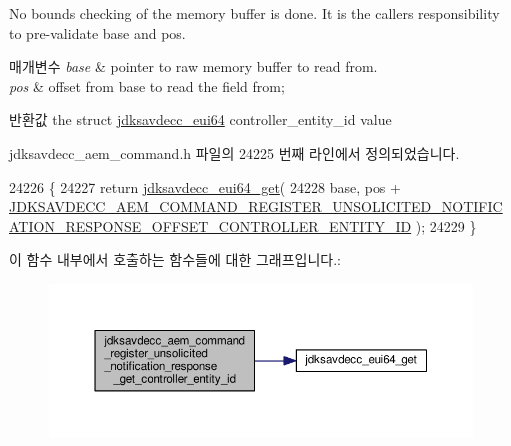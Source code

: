 No bounds checking of the memory buffer is done. It is the caller\textquotesingle{}s responsibility to pre-\/validate base and pos.


\begin{DoxyParams}{매개변수}
{\em base} & pointer to raw memory buffer to read from. \\
\hline
{\em pos} & offset from base to read the field from; \\
\hline
\end{DoxyParams}
\begin{DoxyReturn}{반환값}
the struct \hyperlink{structjdksavdecc__eui64}{jdksavdecc\+\_\+eui64} controller\+\_\+entity\+\_\+id value 
\end{DoxyReturn}


jdksavdecc\+\_\+aem\+\_\+command.\+h 파일의 24225 번째 라인에서 정의되었습니다.


\begin{DoxyCode}
24226 \{
24227     \textcolor{keywordflow}{return} \hyperlink{group__eui64_ga2652311a25a6b91cddbed75c108c7031}{jdksavdecc\_eui64\_get}(
24228         base, pos + 
      \hyperlink{group__command__register__unsolicited__notification__response_gafaddde566434d1826bc05716367e6869}{JDKSAVDECC\_AEM\_COMMAND\_REGISTER\_UNSOLICITED\_NOTIFICATION\_RESPONSE\_OFFSET\_CONTROLLER\_ENTITY\_ID}
       );
24229 \}
\end{DoxyCode}


이 함수 내부에서 호출하는 함수들에 대한 그래프입니다.\+:
\nopagebreak
\begin{figure}[H]
\begin{center}
\leavevmode
\includegraphics[width=350pt]{group__command__register__unsolicited__notification__response_gabb1d7fc5eebc7d298aad0393b1473986_cgraph}
\end{center}
\end{figure}


